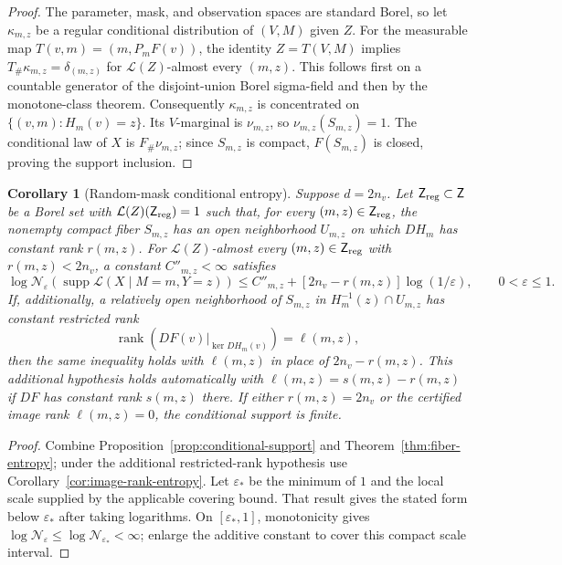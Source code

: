 \documentclass[11pt]{article}
\newtheorem{corollary}[theorem]{Corollary}
\theoremstyle{definition}
\newcommand{\cN}{\mathcal N}
\newcommand{\supp}{\operatorname{supp}}
\newcommand{\rank}{\operatorname{rank}}
\begin{document}
\begin{proof}
The parameter, mask, and observation spaces are standard Borel, so let
$\kappa_{m,z}$ be a regular conditional distribution of $(V,M)$ given $Z$.
For the measurable map
$T(v,m)=(m,P_mF(v))$, the identity $Z=T(V,M)$ implies
$T_\#\kappa_{m,z}=\delta_{(m,z)}$ for $\mathcal L(Z)$-almost every $(m,z)$.
This follows first on a countable generator of the disjoint-union Borel
sigma-field and then by the monotone-class theorem.  Consequently
$\kappa_{m,z}$ is concentrated on
$\{(v,m):H_m(v)=z\}$.  Its $V$-marginal is $\nu_{m,z}$, so
$\nu_{m,z}(S_{m,z})=1$.  The conditional law of $X$ is
$F_\#\nu_{m,z}$; since $S_{m,z}$ is compact, $F(S_{m,z})$ is closed, proving
the support inclusion.
\end{proof}

\begin{corollary}[Random-mask conditional entropy]\label{cor:random-entropy}
Suppose $d=2n_v$.  Let $\mathsf Z_{\rm reg}\subset\mathsf Z$ be a Borel set
with $\mathcal L(Z)(\mathsf Z_{\rm reg})=1$ such that, for every
$(m,z)\in\mathsf Z_{\rm reg}$, the nonempty compact fiber $S_{m,z}$ has an
open neighborhood $U_{m,z}$ on which $DH_m$ has constant rank $r(m,z)$.
For $\mathcal L(Z)$-almost every $(m,z)\in\mathsf Z_{\rm reg}$ with
$r(m,z)<2n_v$, a constant $C''_{m,z}<\infty$ satisfies
\[
 \log\cN_\varepsilon\!\left(
 \supp\mathcal L(X\mid M=m,Y=z)\right)
 \le C''_{m,z}+[2n_v-r(m,z)]\log(1/\varepsilon),
 \qquad 0<\varepsilon\le1.
\]
If, additionally, a relatively open neighborhood of $S_{m,z}$ in
$H_m^{-1}(z)\cap U_{m,z}$ has constant restricted rank
\[
 \rank\!\left(DF(v)|_{\ker DH_m(v)}\right)=\ell(m,z),
\]
then the same inequality holds with $\ell(m,z)$ in place of
$2n_v-r(m,z)$.  This additional hypothesis holds automatically with
$\ell(m,z)=s(m,z)-r(m,z)$ if $DF$ has constant rank $s(m,z)$ there.  If
either $r(m,z)=2n_v$ or the certified
image rank $\ell(m,z)=0$, the conditional support is finite.
\end{corollary}

\begin{proof}
Combine Proposition~\ref{prop:conditional-support} and
Theorem~\ref{thm:fiber-entropy}; under the additional restricted-rank
hypothesis use Corollary~\ref{cor:image-rank-entropy}.  Let
$\varepsilon_*$ be the minimum of $1$ and the local scale supplied by the
applicable covering bound.  That result gives the stated
form below $\varepsilon_*$ after taking logarithms.  On
$[\varepsilon_*,1]$, monotonicity gives
$\log\cN_\varepsilon\le\log\cN_{\varepsilon_*}<\infty$; enlarge the additive
constant to cover this compact scale interval.
\end{proof}
\end{document}
